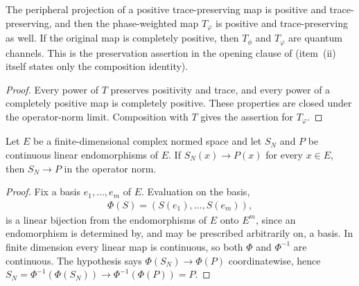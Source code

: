 \begin{corollary}
    \label{cor:peripheral_projection_channel}
    \leanok
    The peripheral projection of a positive trace-preserving map is positive
    and trace-preserving, and then the phase-weighted map $T_\varphi$ is
    positive and trace-preserving as well. If the original map is completely
    positive, then $T_\phi$ and $T_\varphi$ are quantum channels. This
    is the preservation assertion in the opening clause of
    \cite[Proposition~6.3]{Wolf2012Quantum} (item~(ii) itself states only the
    composition identity).
\end{corollary}

\begin{proof}\leanok
    Every power of $T$ preserves positivity and trace, and every power of a
    completely positive map is completely positive. These properties are
    closed under the operator-norm limit. Composition with $T$ gives the
    assertion for $T_\varphi$.
\end{proof}

\begin{lemma}
    \label{lem:tendsto_clm_of_tendsto_apply}
    \leanok
    Let $E$ be a finite-dimensional complex normed space and let $S_N$ and $P$
    be continuous linear endomorphisms of $E$. If $S_N(x)\to P(x)$ for every
    $x\in E$, then $S_N\to P$ in the operator norm.
\end{lemma}

\begin{proof}\leanok
    Fix a basis $e_1,\dots,e_m$ of $E$. Evaluation on the basis,
    \begin{align}
        \Phi(S)=(S(e_1),\dots,S(e_m)),
    \end{align}
    is a linear bijection from the endomorphisms of $E$ onto $E^m$, since an
    endomorphism is determined by, and may be prescribed arbitrarily on, a
    basis. In finite dimension every linear map is continuous, so both $\Phi$
    and $\Phi^{-1}$ are continuous. The hypothesis says $\Phi(S_N)\to\Phi(P)$
    coordinatewise, hence $S_N=\Phi^{-1}(\Phi(S_N))\to\Phi^{-1}(\Phi(P))=P$.
\end{proof}

